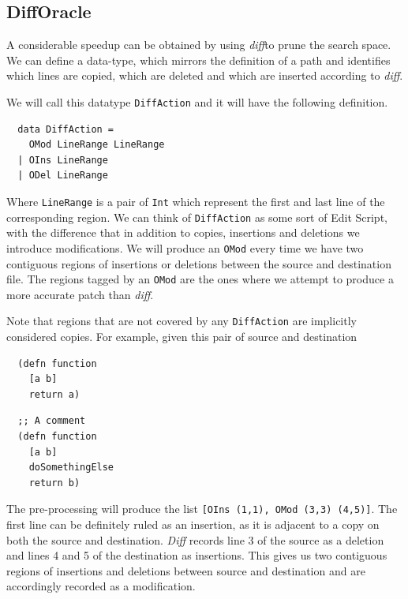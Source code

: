 \documentclass[11pt, titlepage]{article}
\newcommand{\toHaskell}[1]{\texttt{#1}\xspace}
\newcommand{\diff}{\emph{diff}}
\begin{document}
\subsection{DiffOracle}
A considerable speedup can be obtained by using \diff to prune the search space. We can define a data-type, which mirrors the definition of a path and identifies which lines are copied, which are deleted and which are inserted according to \diff.

We will call this datatype \texttt{DiffAction} and it will have the following definition.

\begin{verbatim}
  data DiffAction = 
    OMod LineRange LineRange
  | OIns LineRange
  | ODel LineRange  
\end{verbatim}

Where \toHaskell{LineRange} is a pair of \toHaskell{Int} which represent the first and last line of the corresponding region.
We can think of \toHaskell{DiffAction} as some sort of Edit Script, with the difference that in addition to copies, insertions and deletions we introduce modifications.
We will produce an \toHaskell{OMod} every time we have two contiguous regions of insertions or deletions between the source and destination file. The regions tagged by an \toHaskell{OMod} are the ones where we attempt to produce a more accurate patch than \diff. 

Note that regions that are not covered by any \toHaskell{DiffAction} are implicitly considered copies.
For example, given this pair of source and destination

\vspace{.6em}
\begin{minipage}[t]{0.4\textwidth}
\begin{verbatim}
  (defn function
    [a b]
    return a)
\end{verbatim}
\end{minipage}
\begin{minipage}[t]{0.4\textwidth}
\begin{verbatim}
  ;; A comment
  (defn function
    [a b]
    doSomethingElse
    return b)
\end{verbatim}
\end{minipage}
\vspace{.6em}

The pre-processing will produce the list \toHaskell{[OIns (1,1), OMod (3,3) (4,5)]}. The first line can be definitely ruled as an insertion, as it is adjacent to a copy on both the source and destination. \emph{Diff} records line 3 of the source as a deletion and lines 4 and 5 of the destination as insertions. This gives us two contiguous regions of insertions and deletions between source and destination and are accordingly recorded as a modification. 
\end{document}
